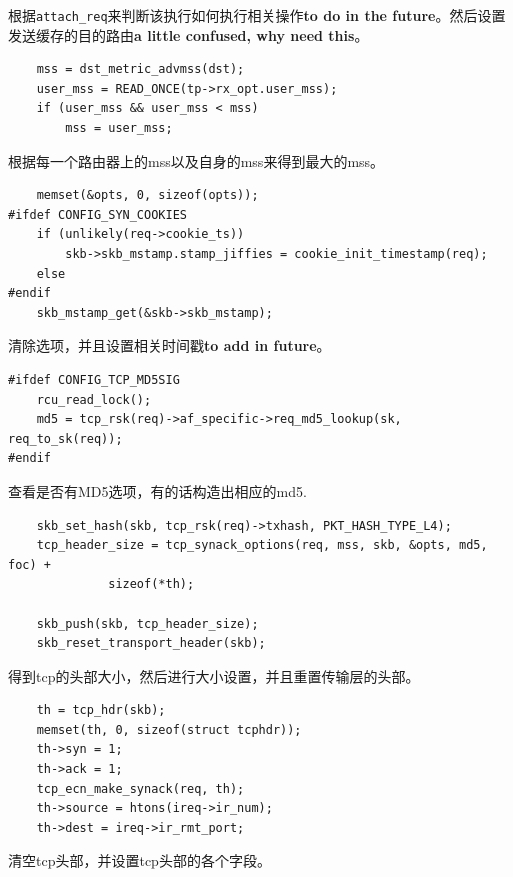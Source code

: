                 根据\texttt{attach_req}来判断该执行如何执行相关操作\textbf{to do in the future}。然后设置发送缓存的目的路由\textbf{a little confused, why need this}。

\begin{verbatim}
    mss = dst_metric_advmss(dst);
    user_mss = READ_ONCE(tp->rx_opt.user_mss);
    if (user_mss && user_mss < mss)
        mss = user_mss;
\end{verbatim}

                根据每一个路由器上的mss以及自身的mss来得到最大的mss。

\begin{verbatim}
    memset(&opts, 0, sizeof(opts));
#ifdef CONFIG_SYN_COOKIES
    if (unlikely(req->cookie_ts))
        skb->skb_mstamp.stamp_jiffies = cookie_init_timestamp(req);
    else
#endif
    skb_mstamp_get(&skb->skb_mstamp);
\end{verbatim}

                清除选项，并且设置相关时间戳\textbf{to add in future}。

\begin{verbatim}
#ifdef CONFIG_TCP_MD5SIG
    rcu_read_lock();
    md5 = tcp_rsk(req)->af_specific->req_md5_lookup(sk, req_to_sk(req));
#endif
\end{verbatim}

                查看是否有MD5选项，有的话构造出相应的md5.

\begin{verbatim}
    skb_set_hash(skb, tcp_rsk(req)->txhash, PKT_HASH_TYPE_L4);
    tcp_header_size = tcp_synack_options(req, mss, skb, &opts, md5, foc) +
              sizeof(*th);

    skb_push(skb, tcp_header_size);
    skb_reset_transport_header(skb);
\end{verbatim}

                得到tcp的头部大小，然后进行大小设置，并且重置传输层的头部。

\begin{verbatim}
    th = tcp_hdr(skb);
    memset(th, 0, sizeof(struct tcphdr));
    th->syn = 1;
    th->ack = 1;
    tcp_ecn_make_synack(req, th);
    th->source = htons(ireq->ir_num);
    th->dest = ireq->ir_rmt_port;
\end{verbatim}

                清空tcp头部，并设置tcp头部的各个字段。

